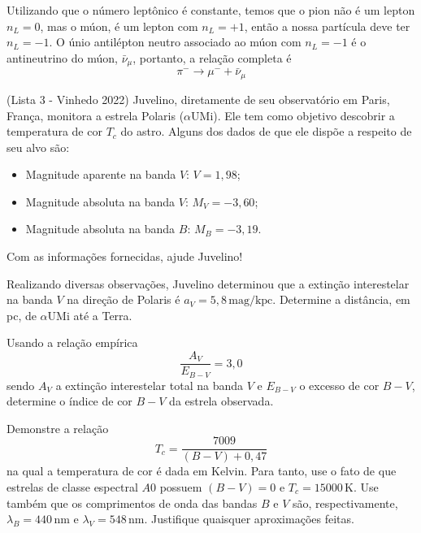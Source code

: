 \documentclass[11pt]{article}
\begin{document}
\begin{pproblem}
\begin{pssolution*}{}{}
\begin{alternativas}
        \item Utilizando que o número leptônico é constante, temos que o pion não é um lepton \(n_L=0\), mas o múon, é um lepton com \(n_L=+1\), então a nossa partícula deve ter \(n_L=-1\). O únio antilépton neutro associado ao múon com \(n_L=-1\) é o antineutrino do múon, \(\bar{\nu}_\mu\), portanto, a relação completa é 
        \[\boxed{\pi^{-}\rightarrow \mu^- + \bar{\nu}_\mu}{}\]

    \end{alternativas}

\end{pssolution*}
\end{pproblem}


\begin{pproblem}(Lista 3 - Vinhedo 2022)
Juvelino, diretamente de seu observatório em Paris, França, monitora a estrela Polaris ($\alpha\text{UMi}$). Ele tem como objetivo descobrir a temperatura de cor $T_c$ do astro. Alguns dos dados de que ele dispõe a respeito de seu alvo são:

\begin{itemize}
    \item Magnitude aparente na banda $V$: $V = 1,98$;
    \item Magnitude absoluta na banda $V$: $M_V = -3,60$;
    \item Magnitude absoluta na banda $B$: $M_B = -3,19$.
\end{itemize}

Com as informações fornecidas, ajude Juvelino!

\begin{alternativas}
    \item Realizando diversas observações, Juvelino determinou que a extinção interestelar na banda $V$ na direção de Polaris é $a_V = 5,8 \, \text{mag/kpc}$. Determine a distância, em pc, de $\alpha\text{UMi}$ até a Terra.
    \item Usando a relação empírica
    \begin{equation}
        \frac{A_V}{E_{B-V}} = 3,0
    \end{equation}
    sendo $A_V$ a extinção interestelar total na banda $V$ e $E_{B-V}$ o excesso de cor $B-V$, determine o índice de cor $B-V$ da estrela observada.
    \item Demonstre a relação
    \begin{equation}
        T_c = \frac{7009}{(B-V) + 0,47}
    \end{equation}
    na qual a temperatura de cor é dada em Kelvin. Para tanto, use o fato de que estrelas de classe espectral $A0$ possuem $(B-V) = 0$ e $T_c = 15000 \, \text{K}$. Use também que os comprimentos de onda das bandas $B$ e $V$ são, respectivamente, $\lambda_B = 440 \, \text{nm}$ e $\lambda_V = 548 \, \text{nm}$. Justifique quaisquer aproximações feitas.


\end{alternativas}
\end{pproblem}
\end{document}
